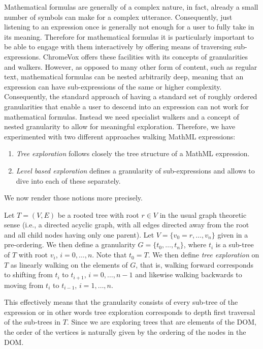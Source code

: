 \documentclass{sig-alternate}
\begin{document}
Mathematical formulas are generally of a complex nature, in fact, already a
small number of symbols can make for a complex utterance.  Consequently, just
listening to an expression once is generally not enough for a user to fully take
in its meaning.  Therefore for mathematical formulas it is particularly
important to be able to engage with them interactively by offering means of
traversing sub-expressions.  ChromeVox offers these facilities with its concepts
of granularities and walkers. However, as opposed to many other form of content,
such as regular text, mathematical formulas can be nested arbitrarily deep,
meaning that an expression can have sub-expressions of the same or higher
complexity. Consequently, the standard approach of having a standard set of
roughly ordered granularities that enable a user to descend into an expression
can not work for mathematical formulas. Instead we need specialist walkers and a
concept of nested granularity to allow for meaningful exploration. Therefore, we
have experimented with two different approaches walking MathML expressions:
\begin{enumerate}[(1)]
\item \emph{Tree exploration} follows closely the tree structure of a MathML expression.
\item \emph{Level based exploration} defines a granularity of
  sub-ex\-pressions and allows to dive into each of these separately.
\end{enumerate}
We now render those notions more precisely.

Let $T=(V,E)$ be a rooted tree with root $r\in V$ in the usual graph theoretic
sense (i.e., a directed acyclic graph, with all edges directed away from the
root and all child nodes having only one parent).  Let $V=\{v_0=r,\ldots,v_n\}$
given in a pre-ordering. We then define a granularity $G=\{t_0,\ldots, t_n\}$,
where $t_i$ is a sub-tree of $T$ with root $v_i$, $i=0,\ldots,n$. Note that
$t_0=T$. We then define \emph{tree exploration} on $T$ as linearly walking on
the elements of $G$, that is, walking forward corresponds to shifting from $t_i$
to $t_{i+1}$, $i=0,\ldots,n-1$ and likewise walking backwards to moving from
$t_i$ to $t_{i-1}$, $i=1,\ldots, n$.

This effectively means that the granularity consists of every sub-tree of the
expression or in other words tree exploration corresponds to depth first
traversal of the sub-trees in $T$. Since we are exploring trees that are
elements of the DOM, the order of the vertices is naturally given by the
ordering of the nodes in the DOM.
\end{document}
